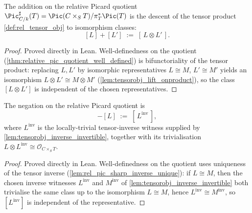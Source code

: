 \begin{definition}
  \label{def:rel_add}
  The addition on the relative Picard quotient
  \(\Pic^\sharp_{C/k}(T) = \Pic(C \times_S T)/\pi_T^*\Pic(T)\) is the descent of
  the tensor product \cref{def:rel_tensor_obj} to isomorphism classes:
  \[
    [L] + [L'] \;:=\; [\,L \otimes L'\,].
  \]
\end{definition}

\begin{proof}
  \leanok
  Proved directly in Lean. Well-definedness on the quotient
  (\cref{thm:relative_pic_quotient_well_defined}) is bifunctoriality of the
  tensor product: replacing \(L, L'\) by isomorphic representatives
  \(L \cong M\), \(L' \cong M'\) yields an isomorphism
  \(L \otimes L' \cong M \otimes M'\) (\cref{lem:tensorobj_lift_onproduct}),
  so the class \([L \otimes L']\) is independent of the chosen representatives.
\end{proof}

\begin{definition}
  \label{def:rel_neg}
  The negation on the relative Picard quotient is
  \[
    -[L] \;:=\; [\,L^{\mathrm{inv}}\,],
  \]
  where \(L^{\mathrm{inv}}\) is the locally-trivial tensor-inverse witness
  supplied by \cref{lem:tensorobj_inverse_invertible}, together with its
  trivialisation \(L \otimes L^{\mathrm{inv}} \cong \mathcal{O}_{C \times_S T}\).
\end{definition}

\begin{proof}
  \leanok
  Proved directly in Lean. Well-definedness on the quotient uses uniqueness of
  the tensor inverse (\cref{lem:rel_pic_sharp_inverse_unique}): if
  \(L \cong M\), then the chosen inverse witnesses \(L^{\mathrm{inv}}\) and
  \(M^{\mathrm{inv}}\) of \cref{lem:tensorobj_inverse_invertible} both trivialise
  the same class up to the isomorphism \(L \cong M\), hence
  \(L^{\mathrm{inv}} \cong M^{\mathrm{inv}}\), so \([L^{\mathrm{inv}}]\) is
  independent of the representative.
\end{proof}


